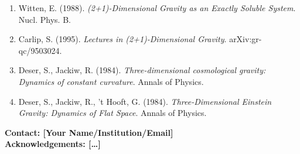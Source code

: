 \documentclass[a0,portrait]{a0poster}
\begin{document}
\begin{multicols}{2}
\begin{enumerate}
    \item Witten, E. (1988). \textit{(2+1)-Dimensional Gravity as an Exactly Soluble System}. Nucl. Phys. B.
    \item Carlip, S. (1995). \textit{Lectures in (2+1)-Dimensional Gravity}. arXiv:gr-qc/9503024.
    \item Deser, S., Jackiw, R. (1984). \textit{Three-dimensional cosmological gravity: Dynamics of constant curvature}. Annals of Physics.
    \item Deser, S., Jackiw, R., 't Hooft, G. (1984). \textit{Three-Dimensional Einstein Gravity: Dynamics of Flat Space}. Annals of Physics.
\end{enumerate}

\end{multicols}

\vspace{1cm}

\begin{center}
\Large
\textbf{Contact: [Your Name/Institution/Email]}\\
\textbf{Acknowledgements: [\ldots]}
\end{center}
\end{document}
